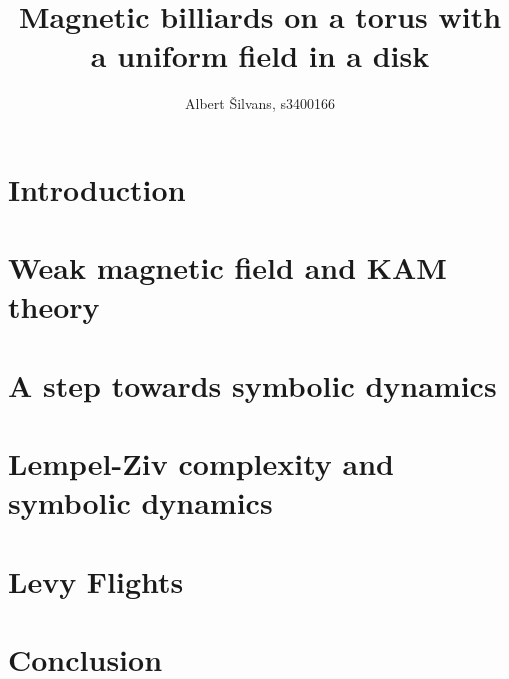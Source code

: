 \documentclass[notitlepage,a4paper,12pt]{article}
\title{Magnetic billiards on a torus with a uniform field in a disk}
\author{Albert \v{S}ilvans, s3400166}
\theoremstyle{definition}
\begin{document}
\maketitle
\newpage
\tableofcontents
\listoffigures
\listoftables
\newpage

\section{Introduction}







\section{Weak magnetic field and KAM theory}






\section{A step towards symbolic dynamics}



\section{Lempel-Ziv complexity and symbolic dynamics}



\section{Levy Flights}


\section{Conclusion}



\newpage


\end{document}
